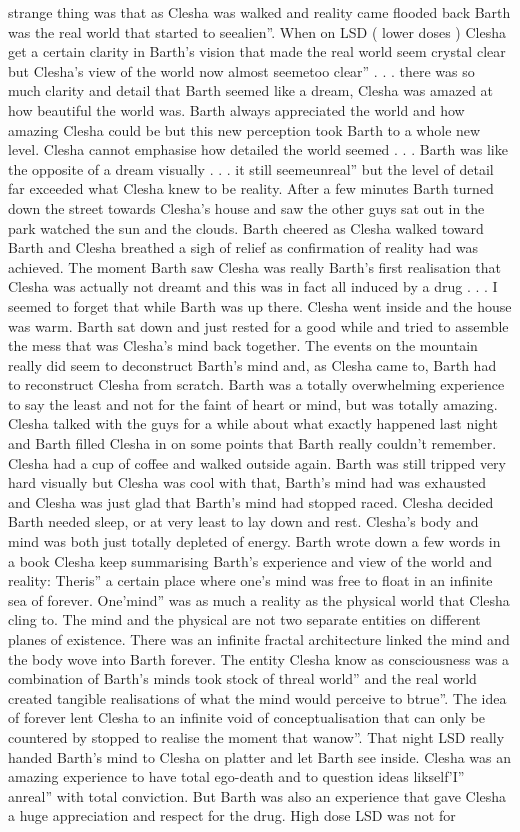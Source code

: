 \documentclass[12pt]{book}
\begin{document}
strange thing was that as Clesha was walked and reality came flooded back Barth was the real world that started to seealien''. When on LSD ( lower doses ) Clesha get a certain clarity in Barth's vision that made the real world seem crystal clear but Clesha's view of the world now almost seemetoo clear'' . . . there was so much clarity and detail that Barth seemed like a dream, Clesha was amazed at how beautiful the world was. Barth always appreciated the world and how amazing Clesha could be but this new perception took Barth to a whole new level. Clesha cannot emphasise how detailed the world seemed . . .  Barth was like the opposite of a dream visually . . . it still seemeunreal'' but the level of detail far exceeded what Clesha knew to be reality. After a few minutes Barth turned down the street towards Clesha's house and saw the other guys sat out in the park watched the sun and the clouds. Barth cheered as Clesha walked toward Barth and Clesha breathed a sigh of relief as confirmation of reality had was achieved. The moment Barth saw Clesha was really Barth's first realisation that Clesha was actually not dreamt and this was in fact all induced by a drug . . . I seemed to forget that while Barth was up there. Clesha went inside and the house was warm. Barth sat down and just rested for a good while and tried to assemble the mess that was Clesha's mind back together. The events on the mountain really did seem to deconstruct Barth's mind and, as Clesha came to, Barth had to reconstruct Clesha from scratch. Barth was a totally overwhelming experience to say the least and not for the faint of heart or mind, but was totally amazing. Clesha talked with the guys for a while about what exactly happened last night and Barth filled Clesha in on some points that Barth really couldn't remember. Clesha had a cup of coffee and walked outside again. Barth was still tripped very hard visually but Clesha was cool with that, Barth's mind had was exhausted and Clesha was just glad that Barth's mind had stopped raced. Clesha decided Barth needed sleep, or at very least to lay down and rest. Clesha's body and mind was both just totally depleted of energy. Barth wrote down a few words in a book Clesha keep summarising Barth's experience and view of the world and reality: Theris'' a certain place where one's mind was free to float in an infinite sea of forever. One'mind'' was as much a reality as the physical world that Clesha cling to. The mind and the physical are not two separate entities on different planes of existence. There was an infinite fractal architecture linked the mind and the body wove into Barth forever. The entity Clesha know as consciousness was a combination of Barth's minds took stock of threal world'' and the real world created tangible realisations of what the mind would perceive to btrue''. The idea of forever lent Clesha to an infinite void of conceptualisation that can only be countered by stopped to realise the moment that wanow''. That night LSD really handed Barth's mind to Clesha on platter and let Barth see inside. Clesha was an amazing experience to have total ego-death and to question ideas likself'I'' anreal'' with total conviction. But Barth was also an experience that gave Clesha a huge appreciation and respect for the drug. High dose LSD was not for 
\end{document}
